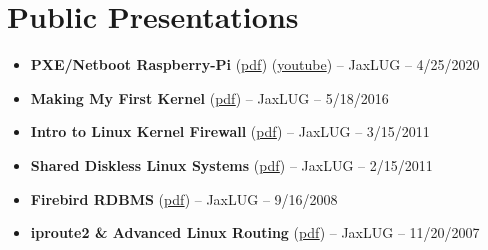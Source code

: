 \documentclass[10pt]{report}
\begin{document}
\section*{Public Presentations}
\begin{itemize}
  \item \textbf{PXE/Netboot Raspberry-Pi} (\href{https://obsidian-studios.com/~wlt/presentations/2020-04-15_jaxlug_pxe_network_booting_raspberry_pis.pdf}{pdf}) (\href{https://www.youtube.com/watch?v=kT5jlbRNgcE}{youtube}) – JaxLUG – 4/25/2020
  \item \textbf{Making My First Kernel} (\href{https://obsidian-studios.com/~wlt/presentations/2016-05-18_jaxlug_making_my_first_kernel.pdf}{pdf}) – JaxLUG – 5/18/2016
  \item \textbf{Intro to Linux Kernel Firewall} (\href{http://www.obsidian-studios.com/~wlt/presentations/2011-03-15_jaxlug_intro_to_linux_kernel_firewall.pdf}{pdf}) – JaxLUG – 3/15/2011
  \item \textbf{Shared Diskless Linux Systems} (\href{http://www.obsidian-studios.com/~wlt/presentations/2011-02-15_jaxlug_shared_diskless_linux_systems.pdf}{pdf}) – JaxLUG – 2/15/2011
  \item \textbf{Firebird RDBMS} (\href{http://www.obsidian-studios.com/~wlt/presentations/2008_09_16_jaxlug_firebird_rdbms.pdf}{pdf}) – JaxLUG – 9/16/2008
  \item \textbf{iproute2 \& Advanced Linux Routing} (\href{http://www.obsidian-studios.com/~wlt/presentations/2007_11_20_jaxlug_iproute2_and_advanced_linux_routing.pdf}{pdf}) – JaxLUG – 11/20/2007
\end{itemize}
\end{document}
